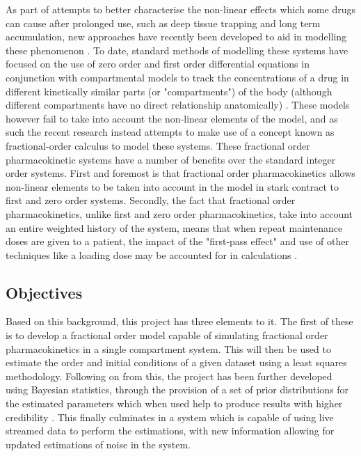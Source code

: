 As part of attempts to better characterise the non-linear effects which some drugs can cause after prolonged use, such as deep tissue trapping and long term accumulation, new approaches have recently been developed to aid in modelling these phenomenon \cite{ion_trapping, cumlative_effects}. To date, standard methods of modelling these systems have focused on the use of zero order and first order differential equations \cite{Clinical_Pharmacokinetics_and_Pharmacodynamics_Concepts} in conjunction with compartmental models to track the concentrations of a drug in different kinetically similar parts (or "compartments") of the body (although different compartments have no direct relationship anatomically) \cite{Compartmental_modeling_in_Pharmacokinetics}. These models however fail to take into account the non-linear elements of the model, and as such the recent research instead attempts to make use of a concept known as fractional-order calculus to model these systems. These fractional order pharmacokinetic systems have a number of benefits over the standard integer order systems. First and foremost is that fractional order pharmacokinetics allows non-linear elements to be taken into account in the model in stark contract to first and zero order systems. Secondly, the fact that fractional order pharmacokinetics, unlike first and zero order pharmacokinetics, take into account an entire weighted history of the system, means that when repeat maintenance doses are given to a patient, the impact of the "first-pass effect" and use of other techniques like a loading dose may be accounted for in calculations \cite{Clinical_Pharmacokinetics_and_Pharmacodynamics_Concepts}. 

\subsection{Objectives} \label{objectives}

Based on this background, this project has three elements to it. The first of these is to develop a fractional order model capable of simulating fractional order pharmacokinetics in a single compartment system. This will then be used to estimate the order and initial conditions of a given dataset using a least squares methodology. Following on from this, the project has been further developed using Bayesian statistics, through the provision of a set of prior distributions for the estimated parameters which when used help to produce results with higher credibility \cite{statistical_rethinking}. This finally culminates in a system which is capable of using live streamed data to perform the estimations, with new information allowing for updated estimations of noise in the system. 

